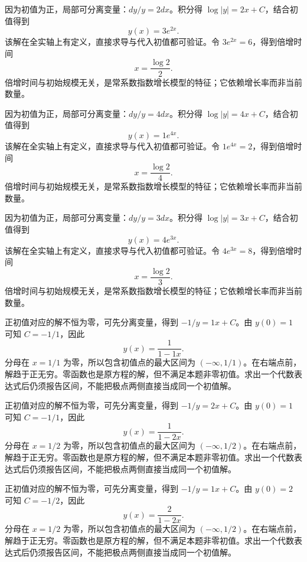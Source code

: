 \documentclass[12pt,fontset=fandol]{ctexart}
\begin{document}
\begin{solve}\label{ans:c22q4}
因为初值为正，局部可分离变量：$dy/y=2dx$。积分得 $\log|y|=2x+C$，结合初值得到
\[
y(x)=3e^{2x}.
\]
该解在全实轴上有定义，直接求导与代入初值都可验证。令 $3e^{2x}=6$，得到倍增时间
\[
x=\frac{\log2}{2}.
\]
倍增时间与初始规模无关，是常系数指数增长模型的特征；它依赖增长率而非当前数量。
\end{solve}

\begin{solve}\label{ans:c22q5}
因为初值为正，局部可分离变量：$dy/y=4dx$。积分得 $\log|y|=4x+C$，结合初值得到
\[
y(x)=1e^{4x}.
\]
该解在全实轴上有定义，直接求导与代入初值都可验证。令 $1e^{4x}=2$，得到倍增时间
\[
x=\frac{\log2}{4}.
\]
倍增时间与初始规模无关，是常系数指数增长模型的特征；它依赖增长率而非当前数量。
\end{solve}

\begin{solve}\label{ans:c22q6}
因为初值为正，局部可分离变量：$dy/y=3dx$。积分得 $\log|y|=3x+C$，结合初值得到
\[
y(x)=4e^{3x}.
\]
该解在全实轴上有定义，直接求导与代入初值都可验证。令 $4e^{3x}=8$，得到倍增时间
\[
x=\frac{\log2}{3}.
\]
倍增时间与初始规模无关，是常系数指数增长模型的特征；它依赖增长率而非当前数量。
\end{solve}

\begin{solve}\label{ans:c22q7}
正初值对应的解不恒为零，可先分离变量，得到 $-1/y=1x+C$。由 $y(0)=1$ 可知 $C=-1/1$，因此
\[
y(x)=\frac{1}{1-1x}.
\]
分母在 $x=1/1$ 为零，所以包含初值点的最大区间为 $(-\infty,1/1)$。在右端点前，解趋于正无穷。零函数也是原方程的解，但不满足本题非零初值。求出一个代数表达式后仍须报告区间，不能把极点两侧直接当成同一个初值解。
\end{solve}

\begin{solve}\label{ans:c22q8}
正初值对应的解不恒为零，可先分离变量，得到 $-1/y=2x+C$。由 $y(0)=1$ 可知 $C=-1/1$，因此
\[
y(x)=\frac{1}{1-2x}.
\]
分母在 $x=1/2$ 为零，所以包含初值点的最大区间为 $(-\infty,1/2)$。在右端点前，解趋于正无穷。零函数也是原方程的解，但不满足本题非零初值。求出一个代数表达式后仍须报告区间，不能把极点两侧直接当成同一个初值解。
\end{solve}

\begin{solve}\label{ans:c22q9}
正初值对应的解不恒为零，可先分离变量，得到 $-1/y=1x+C$。由 $y(0)=2$ 可知 $C=-1/2$，因此
\[
y(x)=\frac{2}{1-2x}.
\]
分母在 $x=1/2$ 为零，所以包含初值点的最大区间为 $(-\infty,1/2)$。在右端点前，解趋于正无穷。零函数也是原方程的解，但不满足本题非零初值。求出一个代数表达式后仍须报告区间，不能把极点两侧直接当成同一个初值解。
\end{solve}
\end{document}
